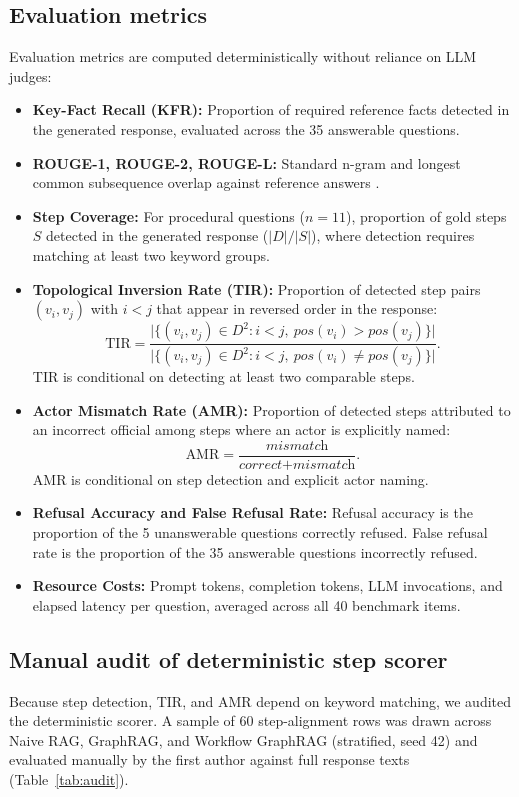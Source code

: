 \documentclass[preprint,10pt]{elsarticle}
\begin{document}
\subsection{Evaluation metrics}
Evaluation metrics are computed deterministically without reliance on LLM judges:
\begin{itemize}[leftmargin=*]
\item \textbf{Key-Fact Recall (KFR):} Proportion of required reference facts detected in the generated response, evaluated across the 35 answerable questions.
\item \textbf{ROUGE-1, ROUGE-2, ROUGE-L:} Standard n-gram and longest common subsequence overlap against reference answers \cite{lin2004rouge}.
\item \textbf{Step Coverage:} For procedural questions ($n=11$), proportion of gold steps $S$ detected in the generated response ($|D|/|S|$), where detection requires matching at least two keyword groups.
\item \textbf{Topological Inversion Rate (TIR):} Proportion of detected step pairs $(v_i, v_j)$ with $i < j$ that appear in reversed order in the response:
\begin{equation}
\text{TIR} = \frac{\bigl|\{(v_i,v_j) \in D^2 : i<j,\ \textit{pos}(v_i) > \textit{pos}(v_j)\}\bigr|}{\bigl|\{(v_i,v_j) \in D^2 : i<j,\ \textit{pos}(v_i) \neq \textit{pos}(v_j)\}\bigr|}.
\end{equation}
TIR is conditional on detecting at least two comparable steps.
\item \textbf{Actor Mismatch Rate (AMR):} Proportion of detected steps attributed to an incorrect official among steps where an actor is explicitly named:
\begin{equation}
\text{AMR} = \frac{\textit{mismatch}}{\textit{correct} + \textit{mismatch}}.
\end{equation}
AMR is conditional on step detection and explicit actor naming.
\item \textbf{Refusal Accuracy and False Refusal Rate:} Refusal accuracy is the proportion of the 5 unanswerable questions correctly refused. False refusal rate is the proportion of the 35 answerable questions incorrectly refused.
\item \textbf{Resource Costs:} Prompt tokens, completion tokens, LLM invocations, and elapsed latency per question, averaged across all 40 benchmark items.
\end{itemize}

\subsection{Manual audit of deterministic step scorer}
\label{sec:audit}
Because step detection, TIR, and AMR depend on keyword matching, we audited the deterministic scorer. A sample of 60 step-alignment rows was drawn across Naive RAG, GraphRAG, and Workflow GraphRAG (stratified, seed 42) and evaluated manually by the first author against full response texts (Table~\ref{tab:audit}).
\end{document}
